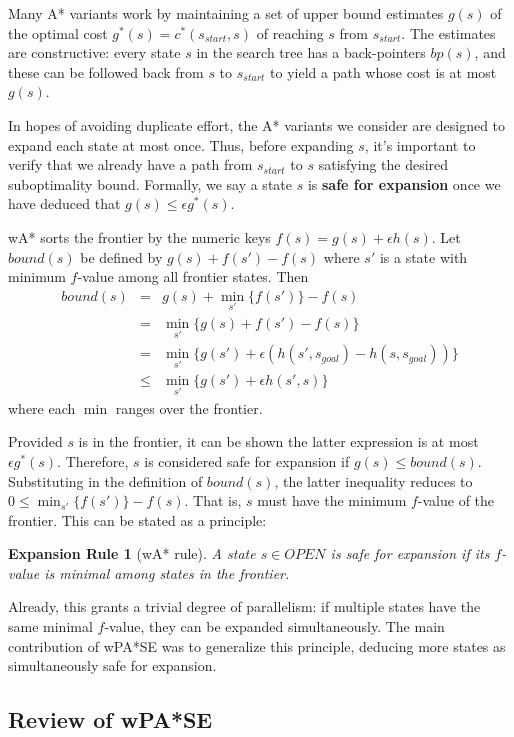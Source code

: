 \documentclass[letterpaper]{article}
\newtheorem{rul}{Expansion Rule}
\begin{document}
Many A* variants work by maintaining a set of upper bound estimates $g(s)$ of the optimal cost $g^*(s) = c^*(s_{start},s)$ of reaching $s$ from $s_{start}$. The estimates are constructive: every state $s$ in the search tree has a back-pointers $bp(s)$, and these can be followed back from $s$ to $s_{start}$ to yield a path whose cost is at most $g(s)$.

In hopes of avoiding duplicate effort, the A* variants we consider are designed to expand each state at most once. Thus, before expanding $s$, it's important to verify that we already have a path from $s_{start}$ to $s$ satisfying the desired suboptimality bound. Formally, we say a state $s$ is \textbf{safe for expansion} once we have deduced that $g(s) \le \epsilon g^*(s)$.

wA* sorts the frontier by the numeric keys $f(s) = g(s) + \epsilon h(s)$. Let $bound(s)$ be defined by $g(s) + f(s') - f(s)$ where $s'$ is a state with minimum $f$-value among all frontier states. Then
\begin{eqnarray*}
bound(s) &=& g(s) + \min_{s'}\{f(s')\} - f(s)
\\&=& \min_{s'}\{g(s) + f(s') - f(s)\}
\\&=& \min_{s'}\{g(s') + \epsilon\left(h(s',s_{goal}) - h(s,s_{goal})\right)\}
\\&\le& \min_{s'}\{g(s') + \epsilon h(s',s)\}
\end{eqnarray*}
where each $\min$ ranges over the frontier.

Provided $s$ is in the frontier, it can be shown the latter expression is at most $\epsilon g^*(s)$. Therefore, $s$ is considered safe for expansion if $g(s) \le bound(s)$. Substituting in the definition of $bound(s)$, the latter inequality reduces to $0 \le \min_{s'}\{f(s')\} - f(s)$. That is, $s$ must have the minimum $f$-value of the frontier. This can be stated as a principle:

\begin{rul}[wA* rule]
A state $s\in OPEN$ is safe for expansion if its $f$-value is minimal among states in the frontier.
\end{rul}

Already, this grants a trivial degree of parallelism: if multiple states have the same minimal $f$-value, they can be expanded simultaneously. The main contribution of wPA*SE was to generalize this principle, deducing more states as simultaneously safe for expansion.

\subsection{Review of wPA*SE}
\end{document}
